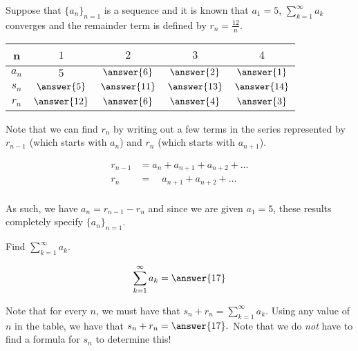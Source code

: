 \documentclass{ximera}
\author{Jim Talamo}
\begin{document}
\begin{exercise}

Suppose that $\{a_n\}_{n=1}$ is a sequence and it is known that $a_1 =5$, $\sum_{k=1}^{\infty} a_k$ converges and the remainder term is defined by $r_n = \frac{12}{n}$.


\begin{center}
\begin{tabular}{c | c | c | c | c }
n& $1$ & $2$ & $3$ & $4$ \\ [2 ex]
\hline
$a_n$ & $ 5$ &$ \answer{6}$ & $ \answer{2}$ & $ \answer{1}$  \\ [2 ex]
\hline
$s_n$ & $ \answer{5}$ &$ \answer{11}$ & $ \answer{13}$ & $ \answer{14}$  \\ [2 ex]
\hline
$r_n$ & $ \answer{12}$ & $ \answer{6}$ & $ \answer{4}$ & $ \answer{3}$ 
\end{tabular}
\end{center}

\begin{hint}
Note that we can find $r_n$ by writing out a few terms in the series represented by $r_{n-1}$ (which starts with $a_n$) and $r_n$ (which starts with $a_{n+1}$).

\begin{align*}
r_{n-1} &= a_n+a_{n+1}+a_{n+2}+\ldots \\
r_{n} &= \phantom{a_n}  a_{n+1}+a_{n+2}+\ldots \\
\end{align*}

As such, we have $a_n = r_{n-1}-r_n$ and since we are given $a_1=5$, these results completely specify $\{a_n\}_{n=1}$.
\end{hint}

\begin{exercise}
Find $\sum_{k=1}^{\infty} a_k$.

\[
\sum_{k=1}^{\infty} a_k =\answer{17}
\]

\begin{hint}
Note that for every $n$, we must have that $s_n +r_n = \sum_{k=1}^{\infty} a_k$.  Using any value of $n$ in the table, we have that $s_n+r_n = \answer{17}.$  Note that we do \emph{not} have to find a formula for $s_n$ to determine this!
\end{hint}
\end{exercise}

\end{exercise}
\end{document}
